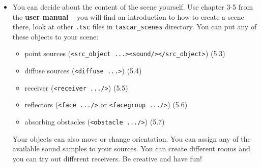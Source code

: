\documentclass[11pt,a4paper,twoside]{article}
\begin{document}
\begin{itemize}
\item You can decide about the content of the scene yourself. Use
  chapter 3-5 from the \textbf{user manual} -- you will find an
  introduction to how to create a scene there, look at other \verb!.tsc!
  files in \verb!tascar_scenes! directory. You can put any of these
  objects to your scene:
  \begin{itemize}
  \item point sources (\verb!<src_object ...><sound/></src_object>!) (5.3)
  \item diffuse sources (\verb!<diffuse ...>!) (5.4)
  \item receiver (\verb!<receiver .../>!) (5.5)
  \item reflectors (\verb!<face .../>! or \verb!<facegroup .../>!) (5.6)
  \item absorbing obstacles (\verb!<obstacle .../>!) (5.7)
  \end{itemize}

  Your objects can also move or change orientation. You can assign any
  of the available sound samples to your sources.  You can create
  different rooms and you can try out different receivers. Be creative
  and have fun!

\end{itemize}
\end{document}
